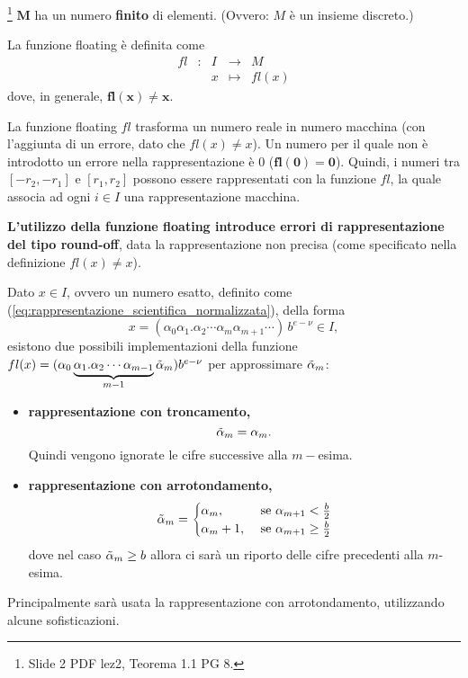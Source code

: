 \begin{theorem}\footnote{Slide 2 PDF lez2, Teorema 1.1 PG 8.}
	$\boldsymbol M$ ha un numero \textbf{finito} di elementi. (Ovvero: $M$ è un insieme discreto.)
\end{theorem}

\begin{definition}
	La funzione floating è definita come
	\begin{equation*}
		\begin{matrix}
			fl&:&I&\rightarrow& M\\
			&&x&\mapsto& fl(x)
		\end{matrix}
	\end{equation*}
	dove, in generale, $\boldsymbol{fl(x)\neq x}$. 
\end{definition}

La funzione floating $fl$ trasforma un numero reale in numero macchina (con l'aggiunta di un errore, dato che $fl(x)\neq x$). Un numero per il quale non è introdotto un errore nella rappresentazione è 0 ($\boldsymbol{fl(0)=0}$). Quindi, i numeri tra $[-r_2,-r_1]$ e $[r_1,r_2]$ possono essere rappresentati con la funzione $fl$, la quale associa ad ogni $i\in I$ una rappresentazione macchina. 

\textbf{L'utilizzo della funzione floating introduce errori di rappresentazione del tipo round-off}, data la rappresentazione non precisa (come specificato nella definizione $fl(x)\neq x$).

Dato $x\in I$, ovvero un numero esatto, definito come (\ref{eq:rappresentazione_scientifica_normalizzata}), della forma 
\begin{equation}\label{eq:numEsatto}
	x=(\alpha_0\alpha_1.\alpha_2\cdots\alpha_m\alpha_{m+1}\cdots)\,b^{e-\nu}\in I,
\end{equation}
esistono due possibili implementazioni della funzione $fl(x)=(\alpha_0\underbrace{\alpha_1.\alpha_2\cdots\alpha_{m-1}}_{m-1}\Tilde{\alpha}_m)b^{e-\nu}$ per approssimare $\Tilde{\alpha}_m$:
\begin{itemize}
	\item \textbf{rappresentazione con troncamento,} \begin{equation}\label{eq:troncamento}
		\Tilde{\alpha}_m=\alpha_m.
	\end{equation}
	Quindi vengono ignorate le cifre successive alla $m-$esima.
	\item \textbf{rappresentazione con arrotondamento,}
	\begin{align}
		\Tilde{\alpha}_m=
		\begin{cases}
			\alpha_m, &\text{ se }\alpha_{m+1}<\frac{b}{2}\\
			\alpha_m+1, &\text{ se }\alpha_{m+1}\geq\frac{b}{2}
		\end{cases}
	\end{align}
	dove nel caso $\Tilde{\alpha}_m\geq b$ allora ci sarà un riporto delle cifre precedenti alla $m$-esima.
\end{itemize}
Principalmente sarà usata la rappresentazione con arrotondamento, utilizzando alcune sofisticazioni.

